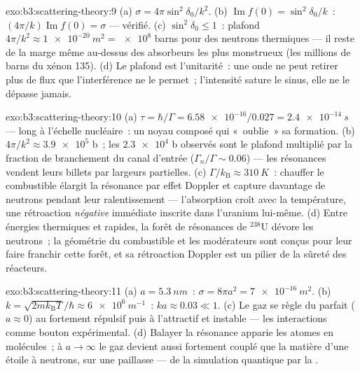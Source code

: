 \begin{solution}{exo:b3:scattering-theory:9}
(a) $\sigma = 4\pi\sin^2\delta_0/k^2$. (b) $\operatorname{Im}f(0)
= \sin^2\delta_0/k$~: $(4\pi/k)\operatorname{Im}f(0) = \sigma$ ---
vérifié. (c) $\sin^2\delta_0 \le 1$~: plafond $4\pi/k^2 \approx
\qty{1e-20}{m^2} = \num{e8}$ barns pour des neutrons thermiques ---
il reste de la marge même au-dessus des absorbeurs les plus
monstrueux (les millions de barns du xénon 135). (d) Le plafond est
l'unitarité~: une onde ne peut retirer plus de flux que l'interférence
ne le permet~; l'intensité sature le sinus, elle ne le dépasse jamais.
\end{solution}

\begin{solution}{exo:b3:scattering-theory:10}
(a) $\tau = \hbar/\Gamma = \num{6.58e-16}/0.027 =
\qty{2.4e-14}{s}$ --- long à l'échelle nucléaire~: un noyau composé
qui «~oublie~» sa formation. (b) $4\pi/k^2 \approx
\num{3.9e5}$ b~; les $\num{2.3e4}$ b observés sont le plafond
multiplié par la fraction de branchement du canal d'entrée ($\Gamma_n/\Gamma
\sim 0.06$) --- les résonances vendent leurs billets par largeurs
partielles. (c) $\Gamma/k_{\text{B}} \approx \qty{310}{K}$~: chauffer
le combustible élargit la résonance par effet Doppler et capture
davantage de neutrons pendant leur ralentissement --- l'absorption
croît avec la température, une rétroaction \emph{négative} immédiate
inscrite dans l'uranium lui-même. (d) Entre énergies thermiques et
rapides, la forêt de résonances de $^{238}$U dévore les neutrons~; la
géométrie du combustible et les modérateurs sont conçus pour leur
faire franchir cette forêt, et sa rétroaction Doppler est un pilier de
la sûreté des réacteurs.
\end{solution}

\begin{solution}{exo:b3:scattering-theory:11}
(a) $a = \qty{5.3}{nm}$~: $\sigma = 8\pi a^2 = \qty{7e-16}{m^2}$.
(b) $k = \sqrt{2mk_{\text{B}}T}/\hbar \approx \qty{6e6}{m^{-1}}$~:
$ka \approx 0.03 \ll 1$. (c) Le gaz se règle du parfait
($a \approx 0$) au fortement répulsif puis à l'attractif et instable
--- les interactions comme bouton expérimental. (d) Balayer la
résonance apparie les atomes en molécules~; à $a \to
\infty$ le gaz devient aussi fortement couplé que la matière d'une
étoile à neutrons, sur une paillasse --- de la simulation quantique
par la .
\end{solution}

